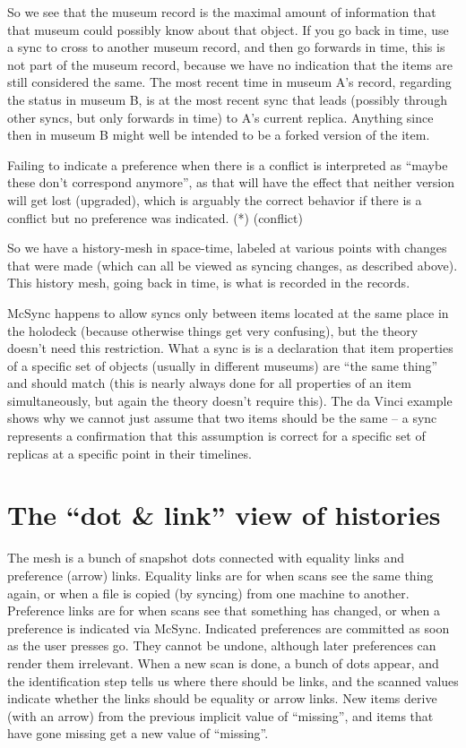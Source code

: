 \documentclass{book}
\begin{document}
So we see that the museum record is the maximal amount of information that that museum could possibly know about that object.  If you go back in time, use a sync to cross to another museum record, and then go forwards in time, this is not part of the museum record, because we have no indication that the items are still considered the same.  The most recent time in museum A's record, regarding the status in museum B, is at the most recent sync that leads (possibly through other syncs, but only forwards in time) to A's current replica.  Anything since then in museum B might well be intended to be a forked version of the item.

Failing to indicate a preference when there is a conflict is interpreted as ``maybe these don't correspond anymore'', as that will have the effect that neither version will get lost (upgraded), which is arguably the correct behavior if there is a conflict but no preference was indicated. (*) (conflict)

So we have a history-mesh in space-time, labeled at various points with changes that were made (which can all be viewed as syncing changes, as described above).  This history mesh, going back in time, is what is recorded in the records.

McSync happens to allow syncs only between items located at the same place in the holodeck (because otherwise things get very confusing), but the theory doesn't need this restriction.  What a sync is is a declaration that item properties of a specific set of objects (usually in different museums) are ``the same thing'' and should match (this is nearly always done for all properties of an item simultaneously, but again the theory doesn't require this).  The da Vinci example shows why we cannot just assume that two items should be the same -- a sync represents a confirmation that this assumption is correct for a specific set of replicas at a specific point in their timelines.
\section{The ``dot \& link'' view of histories}

The mesh is a bunch of snapshot dots connected with equality links and preference (arrow) links.  Equality links are for when scans see the same thing again, or when a file is copied (by syncing) from one machine to another.  Preference links are for when scans see that something has changed, or when a preference is indicated via McSync.  Indicated preferences are committed as soon as the user presses go.  They cannot be undone, although later preferences can render them irrelevant.  When a new scan is done, a bunch of dots appear, and the identification step tells us where there should be links, and the scanned values indicate whether the links should be equality or arrow links.  New items derive (with an arrow) from the previous implicit value of ``missing'', and items that have gone missing get a new value of ``missing''.  
\end{document}
